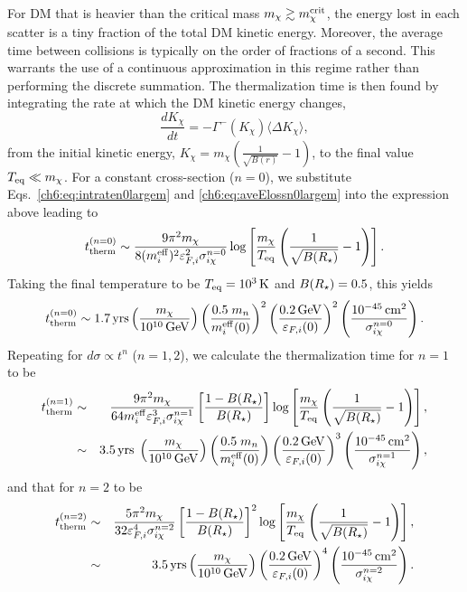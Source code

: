 For DM that is heavier than the critical mass  $m_\chi\gtrsim m_\chi^{\rm crit}$,
the energy lost in each scatter is a tiny fraction of the total DM kinetic energy. Moreover, the average time between collisions is typically on the order of fractions of a second. This warrants the use of a continuous approximation in this regime rather than performing the discrete summation. The thermalization time is then found by integrating the rate at which the DM kinetic energy changes, 
\begin{equation}
    \frac{dK_\chi}{dt} = -\Gamma^{-}(K_\chi) \langle\Delta K_\chi\rangle,  
    \label{ch6:eq:contttherm}
\end{equation}
from the initial kinetic energy, $K_\chi=m_\chi\left(\frac{1}{\sqrt{B(r)}}-1\right)$, to the final value $T_{\rm eq}\ll m_\chi$. For a constant cross-section ($n=0$), we substitute  Eqs.~\ref{ch6:eq:intraten0largem} and \ref{ch6:eq:aveElossn0largem} into the expression above leading to
\begin{equation}
    t_{\rm therm}^{(n=0)} \sim \frac{9 \pi^2 m_\chi}{8 (m_i^{\rm eff})^2 \varepsilon_{F,i}^2 \sigma_{i\chi}^{n=0}}\log\left[\frac{m_\chi}{T_{\rm eq}}\left(\frac{1}{\sqrt{B(R_\star)}}-1\right)\right].
    \label{ch6:eq:tthemheavy0}
\end{equation}
Taking the final temperature to be $T_{\rm eq}=10^3{\rm \,K}$ and $B(R_\star)=0.5$, this yields 
\begin{equation}
    t_{\rm therm}^{(n=0)} \sim 1.7  {\rm \,yrs} \left(\frac{m_\chi }{10^{10}{\rm \,GeV}}\right)\left(\frac{0.5\;m_n}{m_i^{\rm eff}(0)}\right)^{2}\left(\frac{0.2{\rm \,GeV}}{\varepsilon_{F,i}(0)}\right)^{2}\left(\frac{10^{-45}{\rm \,cm}^2}{\sigma_{i\chi}^{n=0}}\right).    
\end{equation}
%
Repeating for $d\sigma\propto t^n$ ($n=1,2$), we calculate the thermalization time for $n=1$ to be
\begin{eqnarray}
    t_{\rm therm}^{(n=1)} &\sim& \frac{9\pi^2 m_\chi}{ 64 m_i^{\rm eff} \varepsilon_{F,i}^3 \sigma_{i\chi}^{n=1}}\left[\frac{1-B(R_\star)}{B(R_\star)}\right] \log\left[\frac{m_\chi}{T_{\rm eq}} \left(\frac{1}{\sqrt{B(R_\star)}}-1\right)\right],\\
    &\sim& 3.5 {\rm \,yrs}\; \left(\frac{m_\chi}{10^{10} {\rm \,GeV}}\right)\left(\frac{0.5\;m_n}{m_i^{\rm eff}(0)}\right) \left(\frac{0.2{\rm \,GeV}}{\varepsilon_{F,i}(0)}\right)^{3}\left(\frac{10^{-45}{\rm \,cm}^2}{\sigma_{i\chi}^{n=1}}\right),
\end{eqnarray}
and that for $n=2$ to be
\begin{eqnarray}
    t_{\rm therm}^{(n=2)} &\sim& \frac{5 \pi^2 m_\chi}{ 32 \varepsilon_{F,i}^4\sigma_{i\chi}^{n=2}} \left[\frac{1-B(R_\star)}{B(R_\star)}\right]^2 \log\left[\frac{m_\chi}{T_{\rm eq}}\left(\frac{1}{\sqrt{B(R_\star)}}-1\right)\right],\\
    &\sim& 3.5 {\rm \,yrs} \left( \frac{m_\chi}{10^{10} {\rm \,GeV}}\right) \left(\frac{0.2{\rm \,GeV}}{\varepsilon_{F,i}(0)}\right)^{4}\left(\frac{10^{-45}{\rm \,cm}^2}{\sigma_{i\chi}^{n=2}}\right). 
\end{eqnarray}







